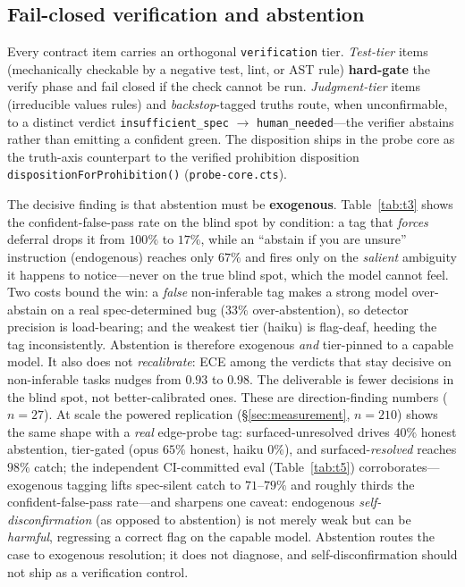 \documentclass[11pt]{article}
\newcommand{\code}[1]{\texttt{#1}}
\begin{document}
\subsection{Fail-closed verification and abstention}
Every contract item carries an orthogonal \texttt{verification} tier. \emph{Test-tier} items
(mechanically checkable by a negative test, lint, or AST rule) \textbf{hard-gate} the verify phase
and fail closed if the check cannot be run. \emph{Judgment-tier} items (irreducible values rules)
and \emph{backstop}-tagged truths route, when unconfirmable, to a distinct verdict
\code{insufficient\_spec} $\to$ \code{human\_needed}---the verifier abstains rather than emitting a
confident green. The disposition ships in the probe core as the truth-axis counterpart to the
verified prohibition disposition \code{dispositionForProhibition()} (\code{probe-core.cts}).

The decisive finding is that abstention must be \textbf{exogenous}. Table~\ref{tab:t3} shows the
confident-false-pass rate on the blind spot by condition: a tag that \emph{forces} deferral drops it
from $100\%$ to $17\%$, while an ``abstain if you are unsure'' instruction (endogenous) reaches only
$67\%$ and fires only on the \emph{salient} ambiguity it happens to notice---never on the true blind
spot, which the model cannot feel. Two costs bound the win: a \emph{false} non-inferable tag makes a
strong model over-abstain on a real spec-determined bug ($33\%$ over-abstention), so detector
precision is load-bearing; and the weakest tier (haiku) is flag-deaf, heeding the tag inconsistently.
Abstention is therefore exogenous \emph{and} tier-pinned to a capable model. It also does not
\emph{recalibrate}: ECE among the verdicts that stay decisive on non-inferable tasks nudges from
$0.93$ to $0.98$. The deliverable is fewer decisions in the blind spot, not better-calibrated ones.
These are direction-finding numbers ($n=27$). At scale the powered replication
(\S\ref{sec:measurement}, $n=210$) shows the same shape with a \emph{real} edge-probe tag:
surfaced-unresolved drives $40\%$ honest abstention, tier-gated (opus $65\%$ honest, haiku $0\%$), and
surfaced-\emph{resolved} reaches $98\%$ catch; the independent CI-committed eval (Table~\ref{tab:t5})
corroborates---exogenous tagging lifts spec-silent catch to $71$--$79\%$ and roughly thirds the
confident-false-pass rate---and sharpens one caveat: endogenous \emph{self-disconfirmation} (as opposed
to abstention) is not merely weak but can be \emph{harmful}, regressing a correct flag on the capable
model. Abstention routes the case to exogenous resolution; it does not diagnose, and self-disconfirmation
should not ship as a verification control.
\end{document}

